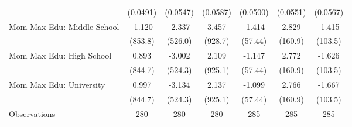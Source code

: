 {\begin{tabular}{l*{6}{c}}
                    &    (0.0491)         &    (0.0547)         &    (0.0587)         &    (0.0500)         &    (0.0551)         &    (0.0567)         \\
\addlinespace
Mom Max Edu: Middle School&      -1.120         &      -2.337         &       3.457         &      -1.414         &       2.829         &      -1.415         \\
                    &     (853.8)         &     (526.0)         &     (928.7)         &     (57.44)         &     (160.9)         &     (103.5)         \\
\addlinespace
Mom Max Edu: High School&       0.893         &      -3.002         &       2.109         &      -1.147         &       2.772         &      -1.626         \\
                    &     (844.7)         &     (524.3)         &     (925.1)         &     (57.44)         &     (160.9)         &     (103.5)         \\
\addlinespace
Mom Max Edu: University&       0.997         &      -3.134         &       2.137         &      -1.099         &       2.766         &      -1.667         \\
                    &     (844.7)         &     (524.3)         &     (925.1)         &     (57.44)         &     (160.9)         &     (103.5)         \\
\midrule
Observations        &         280         &         280         &         280         &         285         &         285         &         285         \\
\bottomrule
\end{tabular}
}
